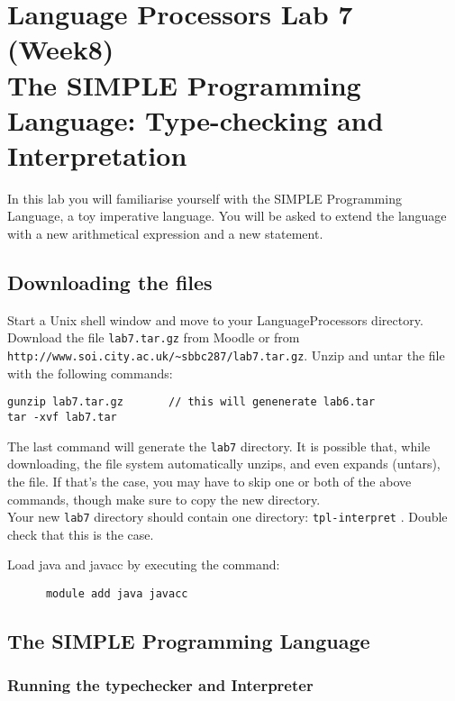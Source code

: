 \documentclass{article}
\begin{document}
\thispagestyle{empty}

\newcommand{\negra}[1]{\textbf{#1}}

\section*{Language Processors Lab 7 (Week8)\\
 The SIMPLE Programming Language: Type-checking and Interpretation}

\medskip\noindent In this lab you will familiarise yourself with the SIMPLE Programming Language, a toy imperative language. You will be asked to extend the language with a new arithmetical expression and a new statement.


\subsection*{Downloading the files}

Start a Unix shell window and move to your LanguageProcessors directory. Download the file {\tt lab7.tar.gz} from Moodle  or from \verb+http://www.soi.city.ac.uk/~sbbc287/lab7.tar.gz+. Unzip and untar the file with the following commands:

\begin{verbatim}
gunzip lab7.tar.gz       // this will genenerate lab6.tar
tar -xvf lab7.tar
\end{verbatim}

The last command will generate the {\tt lab7} directory. It is possible that, while downloading, the file system automatically unzips, and even expands (untars), the file. If that's the case, you may have to skip one or both of the above commands, though make sure to copy the new directory. \\

Your new {\tt lab7} directory should contain one directory: {\tt tpl-interpret} . Double check that this is the case.

Load java and javacc by executing the command:
\begin{verbatim}
      module add java javacc
\end{verbatim}

\subsection*{The SIMPLE Programming Language}

\subsubsection*{Running the typechecker and Interpreter}
\end{document}
